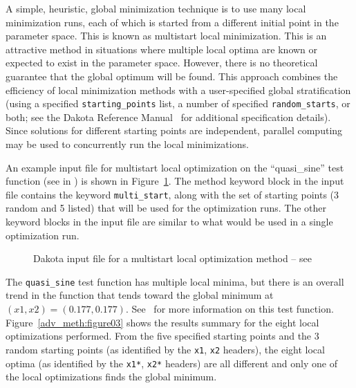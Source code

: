 A simple, heuristic, global minimization technique is to use many
local minimization runs, each of which is started from a different
initial point in the parameter space. This is known as multistart
local minimization. This is an attractive method in situations where
multiple local optima are known or expected to exist in the parameter
space. However, there is no theoretical guarantee that the global
optimum will be found. This approach combines the efficiency of local
minimization methods with a user-specified global stratification
(using a specified \texttt{starting\_points} list, a number of
specified \texttt{random\_starts}, or both; see the Dakota Reference
Manual~\cite{RefMan} for additional specification details). Since
solutions for different starting points are independent, parallel
computing may be used to concurrently run the local minimizations.

An example input file for multistart local optimization on the
``quasi\_sine'' test function (see  in
) is shown in Figure~\ref{adv_meth:figure02}.
The method keyword block in the input file contains the keyword
\texttt{multi\_start}, along with the set of starting points (3 random 
and 5 listed) that will be used for the optimization runs. The other
keyword blocks in the input file are similar to what would be used in
a single optimization run.

\begin{figure}
  \centering
  \begin{bigbox}
    \begin{small}
    \end{small}
  \end{bigbox}
  \caption{Dakota input file for a multistart local optimization method --
see \protect{} }
  \label{adv_meth:figure02}
\end{figure}

The \texttt{quasi\_sine} test function has multiple local minima, but
there is an overall trend in the function that tends toward the global
minimum at $(x1,x2)=(0.177,0.177)$. See~\cite{Giu00} for more
information on this test function. Figure~\ref{adv_meth:figure03} shows
the results summary for the eight local optimizations performed. From
the five specified starting points and the 3 random starting points
(as identified by the \texttt{x1}, \texttt{x2} headers), the eight
local optima (as identified by the \texttt{x1*},
\texttt{x2*} headers) are all different and only one of the local
optimizations finds the global minimum.

